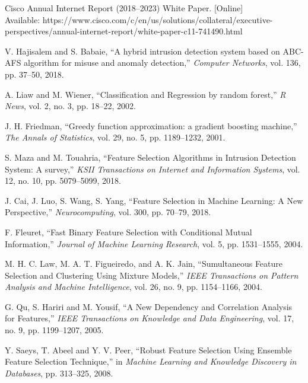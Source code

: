 \documentclass{ieeeaccess}
\theoremstyle{definition}
\begin{document}
\begin{thebibliography}{00}
    Cisco Annual Internet Report (2018–2023) White Paper. [Online] \\ Available: https://www.cisco.com/c/en/us/solutions/collateral/executive- \\ perspectives/annual-internet-report/white-paper-c11-741490.html
    
    V. Hajisalem and S. Babaie, ``A hybrid intrusion detection system based on ABC-AFS algorithm for misuse and anomaly detection,'' \emph{Computer Networks}, vol. 136, pp. 37--50, 2018.

    A. Liaw and M. Wiener, ``Classification and Regression by random forest,'' \emph{R News}, vol. 2, no. 3, pp. 18--22, 2002.

    J. H. Friedman, ``Greedy function approximation: a gradient boosting machine,'' \emph{The Annals of Statistics}, vol. 29, no. 5, pp. 1189--1232, 2001. 

    S. Maza and M. Touahria, ``Feature Selection Algorithms in Intrusion Detection System: A survey,'' \emph{KSII Transactions on Internet and Information Systems}, vol. 12, no. 10, pp. 5079--5099, 2018.

    J. Cai, J. Luo, S. Wang, S. Yang, ``Feature Selection in Machine Learning: A New Perspective,'' \emph{Neurocomputing}, vol. 300, pp. 70--79, 2018.

    F. Fleuret, ``Fast Binary Feature Selection with Conditional Mutual Information,'' \emph{Journal of Machine Learning Research}, vol. 5, pp. 1531--1555, 2004.

    M. H. C. Law, M. A. T. Figueiredo, and A. K. Jain, ``Sumultaneous Feature Selection and Clustering Using Mixture Models,'' \emph{IEEE Transactions on Pattern Analysis and Machine Intelligence}, vol. 26, no. 9, pp. 1154--1166, 2004.

    G. Qu, S. Hariri and M. Yousif, ``A New Dependency and Correlation Analysis for Features,'' \emph{IEEE Transactions on Knowledge and Data Engineering}, vol. 17, no. 9, pp. 1199--1207, 2005.

    Y. Saeys, T. Abeel and Y. V. Peer, ``Robust Feature Selection Using Ensemble Feature Selection Technique,'' in \emph{Machine Learning and Knowledge Discovery in Databases}, pp. 313--325, 2008.


\end{thebibliography}
\end{document}
